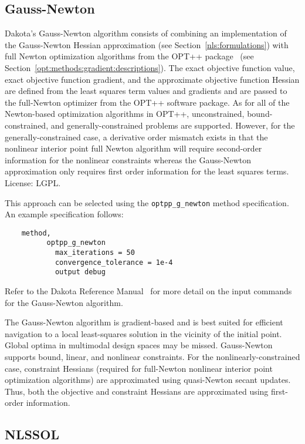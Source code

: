 \subsection{Gauss-Newton}\label{nls:solution:gauss}

Dakota's Gauss-Newton algorithm consists of combining an
implementation of the Gauss-Newton Hessian approximation (see
Section~\ref{nls:formulations}) with full Newton optimization
algorithms from the OPT++ package~\cite{MeOlHoWi07} (see
Section~\ref{opt:methods:gradient:descriptions}). The exact objective
function value, exact objective function gradient, and the approximate
objective function Hessian are defined from the least squares term
values and gradients and are passed to the full-Newton optimizer from
the OPT++ software package. As for all of the Newton-based
optimization algorithms in OPT++, unconstrained, bound-constrained,
and generally-constrained problems are supported. However, for the
generally-constrained case, a derivative order mismatch exists in that
the nonlinear interior point full Newton algorithm will require
second-order information for the nonlinear constraints whereas the
Gauss-Newton approximation only requires first order information for
the least squares terms. License: LGPL.

This approach can be selected using
the \texttt{optpp\_g\_newton} method specification. An example
specification follows:
\begin{small}
\begin{verbatim}
    method,
          optpp_g_newton
            max_iterations = 50
            convergence_tolerance = 1e-4
            output debug
\end{verbatim}
\end{small}

Refer to the Dakota Reference Manual~\cite{RefMan} for more detail on the
input commands for the Gauss-Newton algorithm.

The Gauss-Newton algorithm is gradient-based and is best suited for
efficient navigation to a local least-squares solution in the vicinity
of the initial point. Global optima in multimodal design spaces may be
missed. Gauss-Newton supports bound, linear, and nonlinear
constraints. For the nonlinearly-constrained case, constraint Hessians
(required for full-Newton nonlinear interior point optimization
algorithms) are approximated using quasi-Newton secant updates. Thus,
both the objective and constraint Hessians are approximated using
first-order information.

\subsection{NLSSOL}\label{nls:solution:nlssol}

